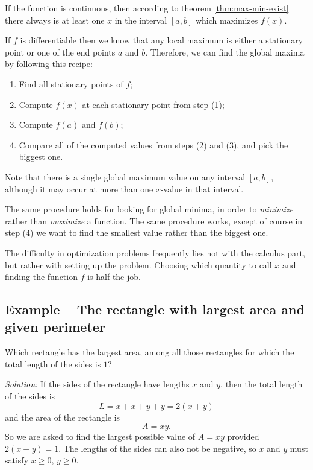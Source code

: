 If the function is continuous, then according to theorem \ref{thm:max-min-exist}
there always is at least one $x$ in the interval $[a,b]$ which maximizes $f(x)$.




If $f$ is differentiable then we know that any local maximum is either a
stationary point or one of the end points $a$ and $b$.  Therefore, we can find
the global maxima by following this recipe:
\begin{enumerate}\sffamily\itshape
\item Find all stationary points of $f$;
\item Compute $f(x)$ at each stationary point from step (1);
\item Compute $f(a)$ and $f(b)$;
\item Compare all of the computed values from steps (2) and (3), and pick the biggest one.
\end{enumerate}
Note that there is a single global maximum value on any interval $[a,b]$, although it may occur at more than one $x$-value in that interval.




The same procedure holds for looking for global minima, in order to
\textit{minimize} rather than \textit{maximize} a function.  The same procedure
works, except of course in step (4) we want to find the smallest value rather
than the biggest one.




The difficulty in optimization problems frequently lies not with the calculus
part, but rather with setting up the problem.  Choosing which quantity to call
$x$ and finding the function $f$ is half the job.


\subsection{Example -- The rectangle with largest area and given perimeter} %
Which rectangle has the largest area, among all those rectangles for which the
total length of the sides is $1$?

\textit{Solution: } If the sides of the rectangle have lengths $x$ and $y$, then
the total length of the sides is
\[
L = x+x+y+y = 2(x+y)
\]
and the area of the rectangle is
\[
A = xy.
\]
So we are asked to find the largest possible value of $A=xy$ provided
$2(x+y)=1$.  The lengths of the sides can also not be negative, so $x$
and $y$ must satisfy $x\geq0$, $y\geq0$.

